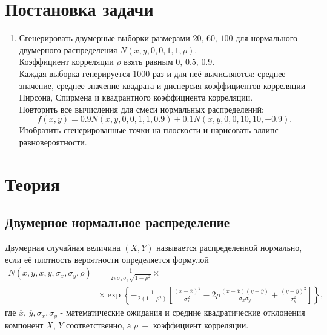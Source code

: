\documentclass[a4paper]{article}
\begin{document}

\tableofcontents
{}
\newpage
\listoffigures
{}
\newpage
\listoftables
{}
\newpage
\section{Постановка задачи}
\begin{enumerate}
    \item Сгенерировать двумерные выборки размерами $20,\,60,\,100$ для нормального двумерного распределения $N(x,y,0,0,1,1,\rho)$.\\
    Коэффициент корреляции $\rho$ взять равным $0,\,0.5,\,0.9$.\\
    Каждая выборка генерируется $1000$ раз и для неё вычисляются: среднее значение, среднее значение квадрата и дисперсия коэффициентов корреляции Пирсона, Спирмена и квадрантного коэффициента корреляции.\\
    Повторить все вычисления для смеси нормальных распределений:
    \begin{equation*}
        f(x,y)=0.9N(x,y,0,0,1,1,0.9)+0.1N(x,y,0,0,10,10,-0.9).
    \end{equation*}
    Изобразить сгенерированные точки на плоскости и нарисовать эллипс
    равновероятности.
\end{enumerate}
\section{Теория}
\subsection{Двумерное нормальное распределение}
Двумерная случайная величина $(X, Y)$ называется распределенной нормально, если её плотность вероятности определяется формулой
\begin{align}
    N(x,y,\overline{x},\overline{y},\sigma_x,\sigma_y,\rho)&=\frac{1}{2\pi\sigma_x\sigma_y\sqrt{1-\rho^2}}\times\nonumber\\
    &\times\exp\left\{-\frac{1}{2(1-\rho^2)}\left[\frac{\left(x-\overline{x}\right)^2}{\sigma_x^2}-2\rho\frac{(x-\overline{x})(y-\overline{y})}{\sigma_x\sigma_y}+\frac{\left(y-\overline{y}\right)^2}{\sigma_y^2}\right]\right\},
\end{align}
где $\overline{x},\,\overline{y},\sigma_x,\sigma_y$ - математические ожидания и средние квадратические отклонения компонент $X,\,Y$ соответственно, а $\rho\:-$ коэффициент корреляции. 
\end{document}
